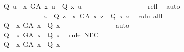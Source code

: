 \begin{isabellebody}
\ {\isachardoublequoteopen}{\isacharparenleft}{\isasymP}\ Q\ u{\isacharparenright}\ {\isasymlongrightarrow}\ {\isacharparenleft}{\isasymforall}x{\isachardot}\ G\isactrlsup A\ x\ u\ {\isasymlongrightarrow}\ {\isacharparenleft}{\isacharparenleft}Q\ x{\isacharparenright}{\isacharparenright}\ u{\isacharparenright}{\isachardoublequoteclose}\ \isanewline
\ \ \ \ \ \ \ \ \ \ \ \ \ \ \ \ \isamarkupfalse%
\ refl\ \isamarkupfalse%
\ auto\ %
\isanewline
\ \ \ \ \ \ \ \ \ \ \ \ \isacommand{{\isacharbraceright}}\isamarkupfalse%
\ \ \ \ \isanewline
\ \ \ \ \ \ \ \ \ \ \ \ \isamarkupfalse%
\ {\isachardoublequoteopen}{\isasymforall}z{\isachardot}\ {\isacharparenleft}{\isasymP}\ Q\ z{\isacharparenright}\ {\isasymlongrightarrow}\ {\isacharparenleft}{\isasymforall}x{\isachardot}\ G\isactrlsup A\ x\ z\ {\isasymlongrightarrow}\ Q\ x\ z{\isacharparenright}{\isachardoublequoteclose}\ \isamarkupfalse%
\ {\isacharparenleft}rule\ allI{\isacharparenright}\isanewline
\ \ \ \ \ \ \ \ \ \ \ \ \isamarkupfalse%
\ {\isachardoublequoteopen}{\isasymlfloor}{\isasymP}\ Q\ \isactrlbold {\isasymrightarrow}\ {\isacharparenleft}\isactrlbold {\isasymforall}x{\isachardot}\ G\isactrlsup A\ x\ \isactrlbold {\isasymrightarrow}\ Q\ x{\isacharparenright}{\isasymrfloor}{\isachardoublequoteclose}\isanewline
\ \ \ \ \ \ \ \ \ \ \ \ \ \ \isamarkupfalse%
\ auto\ %
\isanewline
\ \ \ \ \ \ \ \ \ \ \ \ \isamarkupfalse%
\ {\isachardoublequoteopen}{\isasymlfloor}\isactrlbold {\isasymbox}{\isacharparenleft}{\isasymP}\ Q\ \isactrlbold {\isasymrightarrow}\ {\isacharparenleft}\isactrlbold {\isasymforall}x{\isachardot}\ G\isactrlsup A\ x\ \isactrlbold {\isasymrightarrow}\ Q\ x{\isacharparenright}{\isacharparenright}{\isasymrfloor}{\isachardoublequoteclose}\ \isamarkupfalse%
\ {\isacharparenleft}rule\ NEC{\isacharparenright}\ \isanewline
\ \ \ \ \ \ \ \ \ \ \ \ \isanewline
\ \ \ \ \ \ \ \ \ \ \ \ \isamarkupfalse%
\ {\isachardoublequoteopen}{\isasymlfloor}{\isacharparenleft}\isactrlbold {\isasymbox}{\isacharparenleft}{\isasymP}\ Q{\isacharparenright}{\isacharparenright}\ \isactrlbold {\isasymrightarrow}\ \isactrlbold {\isasymbox}{\isacharparenleft}\isactrlbold {\isasymforall}x{\isachardot}\ G\isactrlsup A\ x\ \isactrlbold {\isasymrightarrow}\ Q\ x{\isacharparenright}{\isasymrfloor}{\isachardoublequoteclose}\ \isamarkupfalse%

\end{isabellebody}
